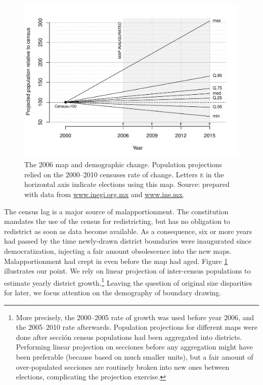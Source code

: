 \documentclass[letter,12pt]{article}
\begin{document}
\begin{figure}
\centering 
  \includegraphics[width=.8\columnwidth]{disRelPopProj2006map.pdf} 
  \caption{The 2006 map and demographic change. Population projections relied on the 2000--2010 censuses rate of change. Letters \textsc{e} in the horizontal axis indicate elections using this map. Source: prepared with data from \url{www.inegi.org.mx} and \url{www.ine.mx}.}\label{F:disRelPop2006map}
\end{figure}

The census lag is a major source of malapportionment. The constitution mandates the use of the census for redistricting, but has no obligation to redistrict as soon as data become available. As a consequence, six or more years had passed by the time newly-drawn district boundaries were inaugurated since democratization, injecting a fair amount obsolescence into the new maps. Malapportionment had crept in even before the map had aged. Figure \ref{F:disRelPop2006map} illustrates our point. We rely on linear projection of inter-census populations to estimate yearly district growth.\footnote{More precisely, the 2000--2005 rate of growth was used before year 2006, and the 2005--2010 rate afterwards. Population projections for different maps were done after secci\'on census populations had been aggregated into districts. Performing linear projection on secciones before any aggregation might have been preferable (because based on much smaller units), but a fair amount of over-populated secciones are routinely broken into new ones between elections, complicating the projection exercise.} Leaving the question of original size disparities for later, we focus attention on the demography of boundary drawing.  
\end{document}
